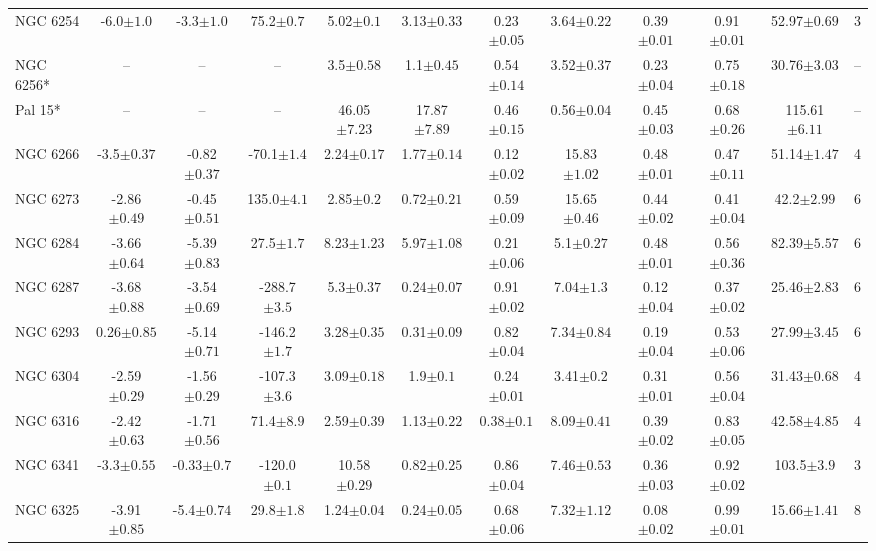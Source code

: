 \begin{landscape}
\begin{table}
\begin{tabular}{lccccccccccc}
NGC 6254 & -6.0$\pm{1.0}$ & -3.3$\pm{1.0}$ & 75.2$\pm{0.7}$ & 5.02$\pm{0.1}$ & 3.13$\pm{0.33}$ & 0.23$\pm{0.05}$ & 3.64$\pm{0.22}$ & 0.39$\pm{0.01}$ & 0.91$\pm{0.01}$ & 52.97$\pm{0.69}$&3 \\ 
NGC 6256* & -- & -- & -- & 3.5$\pm{0.58}$ & 1.1$\pm{0.45}$ & 0.54$\pm{0.14}$ & 3.52$\pm{0.37}$ & 0.23$\pm{0.04}$ & 0.75$\pm{0.18}$ & 30.76$\pm{3.03}$&-- \\ 
Pal 15* & -- & -- & -- & 46.05$\pm{7.23}$ & 17.87$\pm{7.89}$ & 0.46$\pm{0.15}$ & 0.56$\pm{0.04}$ & 0.45$\pm{0.03}$ & 0.68$\pm{0.26}$ & 115.61$\pm{6.11}$&-- \\ 
NGC 6266 & -3.5$\pm{0.37}$ & -0.82$\pm{0.37}$ & -70.1$\pm{1.4}$ & 2.24$\pm{0.17}$ & 1.77$\pm{0.14}$ & 0.12$\pm{0.02}$ & 15.83$\pm{1.02}$ & 0.48$\pm{0.01}$ & 0.47$\pm{0.11}$ & 51.14$\pm{1.47}$&4 \\ 
NGC 6273 & -2.86$\pm{0.49}$ & -0.45$\pm{0.51}$ & 135.0$\pm{4.1}$ & 2.85$\pm{0.2}$ & 0.72$\pm{0.21}$ & 0.59$\pm{0.09}$ & 15.65$\pm{0.46}$ & 0.44$\pm{0.02}$ & 0.41$\pm{0.04}$ & 42.2$\pm{2.99}$&6 \\ 
NGC 6284 & -3.66$\pm{0.64}$ & -5.39$\pm{0.83}$ & 27.5$\pm{1.7}$ & 8.23$\pm{1.23}$ & 5.97$\pm{1.08}$ & 0.21$\pm{0.06}$ & 5.1$\pm{0.27}$ & 0.48$\pm{0.01}$ & 0.56$\pm{0.36}$ & 82.39$\pm{5.57}$&6 \\ 
NGC 6287 & -3.68$\pm{0.88}$ & -3.54$\pm{0.69}$ & -288.7$\pm{3.5}$ & 5.3$\pm{0.37}$ & 0.24$\pm{0.07}$ & 0.91$\pm{0.02}$ & 7.04$\pm{1.3}$ & 0.12$\pm{0.04}$ & 0.37$\pm{0.02}$ & 25.46$\pm{2.83}$&6 \\ 
NGC 6293 & 0.26$\pm{0.85}$ & -5.14$\pm{0.71}$ & -146.2$\pm{1.7}$ & 3.28$\pm{0.35}$ & 0.31$\pm{0.09}$ & 0.82$\pm{0.04}$ & 7.34$\pm{0.84}$ & 0.19$\pm{0.04}$ & 0.53$\pm{0.06}$ & 27.99$\pm{3.45}$&6 \\ 
NGC 6304 & -2.59$\pm{0.29}$ & -1.56$\pm{0.29}$ & -107.3$\pm{3.6}$ & 3.09$\pm{0.18}$ & 1.9$\pm{0.1}$ & 0.24$\pm{0.01}$ & 3.41$\pm{0.2}$ & 0.31$\pm{0.01}$ & 0.56$\pm{0.04}$ & 31.43$\pm{0.68}$&4 \\ 
NGC 6316 & -2.42$\pm{0.63}$ & -1.71$\pm{0.56}$ & 71.4$\pm{8.9}$ & 2.59$\pm{0.39}$ & 1.13$\pm{0.22}$ & 0.38$\pm{0.1}$ & 8.09$\pm{0.41}$ & 0.39$\pm{0.02}$ & 0.83$\pm{0.05}$ & 42.58$\pm{4.85}$&4 \\ 
NGC 6341 & -3.3$\pm{0.55}$ & -0.33$\pm{0.7}$ & -120.0$\pm{0.1}$ & 10.58$\pm{0.29}$ & 0.82$\pm{0.25}$ & 0.86$\pm{0.04}$ & 7.46$\pm{0.53}$ & 0.36$\pm{0.03}$ & 0.92$\pm{0.02}$ & 103.5$\pm{3.9}$&3 \\ 
NGC 6325 & -3.91$\pm{0.85}$ & -5.4$\pm{0.74}$ & 29.8$\pm{1.8}$ & 1.24$\pm{0.04}$ & 0.24$\pm{0.05}$ & 0.68$\pm{0.06}$ & 7.32$\pm{1.12}$ & 0.08$\pm{0.02}$ & 0.99$\pm{0.01}$ & 15.66$\pm{1.41}$&8 \\ 

\end{tabular}
\end{table}
\end{landscape}
